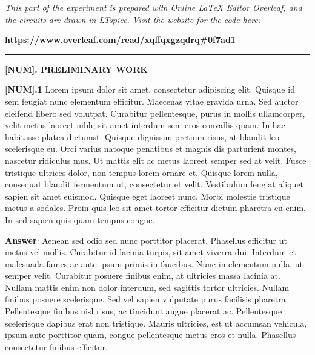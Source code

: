 \documentclass{article}
\begin{document}
{\large \textit{This part of the experiment is prepared with Online LaTeX Editor Overleaf, and the circuits are drawn in LTspice. Visit the website for the code here:}} %

{\large \textbf{https://www.overleaf.com/read/xqffqxgzqdrq\#0f7ad1}}
\vspace{4mm}
\hrule
\vspace{4mm}
{\textbf{\Large [NUM]. PRELIMINARY WORK}} %

\vspace{4mm} %



{\Large \textbf{[NUM].1} Lorem ipsum dolor sit amet, consectetur adipiscing elit. Quisque id sem feugiat nunc elementum efficitur. Maecenas vitae gravida urna. Sed auctor eleifend libero sed volutpat. Curabitur pellentesque, purus in mollis ullamcorper, velit metus laoreet nibh, sit amet interdum sem eros convallis quam. In hac habitasse platea dictumst. Quisque dignissim pretium risus, at blandit leo scelerisque eu. Orci varius natoque penatibus et magnis dis parturient montes, nascetur ridiculus mus. Ut mattis elit ac metus laoreet semper sed at velit. Fusce tristique ultrices dolor, non tempus lorem ornare et. Quisque lorem nulla, consequat blandit fermentum ut, consectetur et velit. Vestibulum feugiat aliquet sapien sit amet euismod. Quisque eget laoreet nunc. Morbi molestie tristique metus a sodales. Proin quis leo sit amet tortor efficitur dictum pharetra eu enim. In sed sapien quis quam tempus congue.} %

\vspace{4mm} %

{\Large \textbf{Answer}: Aenean sed odio sed nunc porttitor placerat. Phasellus efficitur ut metus vel mollis. Curabitur id lacinia turpis, sit amet viverra dui. Interdum et malesuada fames ac ante ipsum primis in faucibus. Nunc in elementum nulla, ut semper velit. Curabitur posuere finibus enim, at ultricies massa lacinia at. Nullam mattis enim non dolor interdum, sed sagittis tortor ultricies. Nullam finibus posuere scelerisque. Sed vel sapien vulputate purus facilisis pharetra. Pellentesque finibus nisl risus, ac tincidunt augue placerat ac. Pellentesque scelerisque dapibus erat non tristique. Mauris ultricies, est ut accumsan vehicula, ipsum ante porttitor quam, congue pellentesque metus eros et nulla. Phasellus consectetur finibus efficitur.} %
\end{document}
